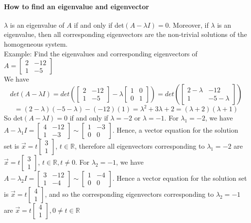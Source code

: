 \documentclass[10pt,letter]{article}
\begin{document}
\paragraph{How to find an eigenvalue and eigenvector} $\lambda$ is an eigenvalue of $A$ if and only if det$(A-\lambda I)=0$. Moreover, if $\lambda$ is an eigenvalue, then all corresponding eigenvectors are the non-trivial solutions of the homogeneous system. \\ 
Example: Find the eigenvalues and corresponding eigenvectors of $A=\begin{bmatrix}2&-12\\1&-5\end{bmatrix}$\\ 
We have $$det(A-\lambda I)=det\left(\begin{bmatrix}2&-12\\1&-5\end{bmatrix}-\lambda\begin{bmatrix}1&0\\0&1\end{bmatrix}\right)=det\left(\begin{bmatrix}2-\lambda&-12\\1&-5-\lambda\end{bmatrix}\right)$$ $$=(2-\lambda)(-5-\lambda)-(-12)(1)=\lambda^2+3\lambda+2=(\lambda+2)(\lambda+1)$$ So det$(A-\lambda I)=0$ if and only if $\lambda=-2$ or $\lambda=-1$. For $\lambda_1=-2$, we have $A-\lambda_1I=\begin{bmatrix}4&-12\\1&-3\end{bmatrix}\sim \begin{bmatrix}1&-3\\0&0\end{bmatrix}$. Hence, a vector equation for the solution set is $\vec{x}=t\begin{bmatrix}3\\1\end{bmatrix}$, $t\in\mathbb{R}$, therefore all eigenvectors corresponding to $\lambda_1=-2$ are $\vec{x}=t\begin{bmatrix}3\\1\end{bmatrix}$, $t\in\mathbb{R},t\neq0$. For $\lambda_2=-1$, we have $A-\lambda_2I=\begin{bmatrix}3&-12\\1&-4\end{bmatrix}\sim\begin{bmatrix}1&-4\\0&0\end{bmatrix}$. Hence a vector equation for the solution set is $\vec{x}=t\begin{bmatrix}4\\1\end{bmatrix}$, and so the corresponding eigenvectors corresponding to $\lambda_2=-1$ are $\vec{x}=t\begin{bmatrix}4\\1\end{bmatrix},0\neq t\in\mathbb{R}$\\ 
\end{document}
